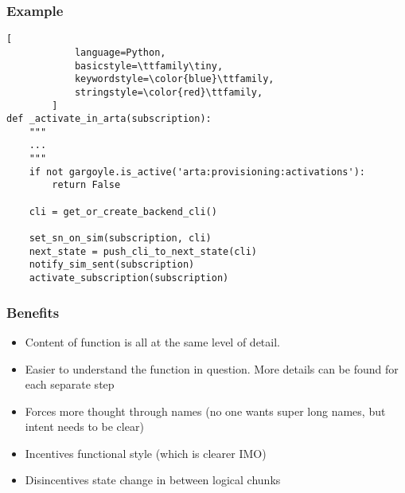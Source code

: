 \begin{frame}[fragile]
\frametitle{Example}
	\begin{block}{}
        \begin{lstlisting}[
            language=Python,
            basicstyle=\ttfamily\tiny,
            keywordstyle=\color{blue}\ttfamily,
            stringstyle=\color{red}\ttfamily,
        ]
def _activate_in_arta(subscription):
    """
    ...
    """
    if not gargoyle.is_active('arta:provisioning:activations'):
        return False

    cli = get_or_create_backend_cli()

    set_sn_on_sim(subscription, cli)
    next_state = push_cli_to_next_state(cli)
    notify_sim_sent(subscription)
    activate_subscription(subscription)
        \end{lstlisting}
	\end{block}
\end{frame}

\begin{frame}
    \frametitle{Benefits}
    \begin{block}{}
        \begin{itemize}
            \item Content of function is all at the same level of detail.
            \item Easier to understand the function in question. More details can be found for each separate step
            \item Forces more thought through names (no one wants super long names, but intent needs to be clear)
            \item Incentives functional style (which is clearer IMO)
            \item Disincentives state change in between logical chunks
        \end{itemize}
    \end{block}
\end{frame}
